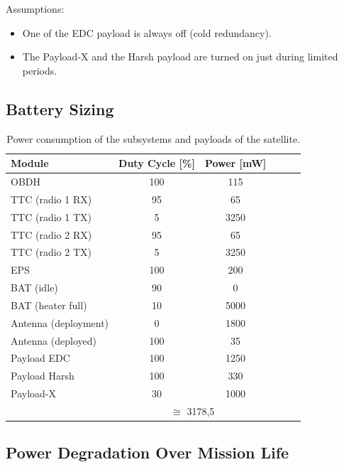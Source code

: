Assumptions:

\begin{itemize}
    \item One of the EDC payload is always off (cold redundancy).
    \item The Payload-X and the Harsh payload are turned on just during limited periods.
\end{itemize}

\subsection{Battery Sizing}

\begin{table}[!h]
    \centering
    \begin{tabular}{lccccc}
        \toprule[1.5pt]
        \textbf{Module} & \textbf{Duty Cycle [\%]}    & \textbf{Power [mW]} \\
        \midrule
        OBDH                    & 100   & 115 \\
        TTC (radio 1 RX)        & 95    & 65 \\
        TTC (radio 1 TX)        & 5     & 3250 \\
        TTC (radio 2 RX)        & 95    & 65 \\
        TTC (radio 2 TX)        & 5     & 3250 \\
        EPS                     & 100   & 200 \\
        BAT (idle)              & 90    & 0 \\
        BAT (heater full)       & 10    & 5000 \\
        Antenna (deployment)    & 0     & 1800 \\
        Antenna (deployed)      & 100   & 35 \\
        Payload EDC             & 100   & 1250 \\
        Payload Harsh           & 100   & 330 \\
        Payload-X               & 30    & 1000 \\
        \cmidrule{2-3}
                                & \multicolumn{2}{c}{$\cong$ 3178,5} \\
        \bottomrule[1.5pt]
    \end{tabular}
    \caption{Power consumption of the subsystems and payloads of the satellite.}
    \label{tab:power-consumption}
\end{table}

\subsection{Power Degradation Over Mission Life}


